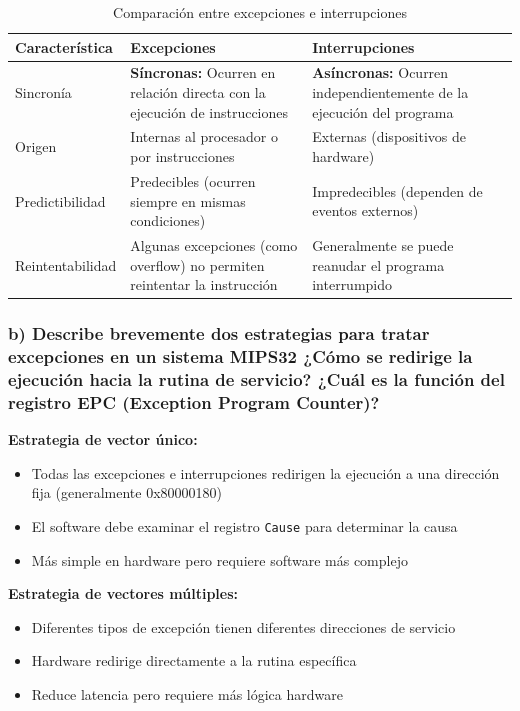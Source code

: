 \documentclass[12pt]{article}
\begin{document}
	\begin{table}[h]
		\centering
		\begin{tabular}{|p{3cm}|p{5cm}|p{5cm}|}
			\hline
			\textbf{Característica} & \textbf{Excepciones} & \textbf{Interrupciones} \\
			\hline
			Sincronía & \textbf{Síncronas:} Ocurren en relación directa con la ejecución de instrucciones & \textbf{Asíncronas:} Ocurren independientemente de la ejecución del programa \\
			\hline
			Origen & Internas al procesador o por instrucciones & Externas (dispositivos de hardware) \\
			\hline
			Predictibilidad & Predecibles (ocurren siempre en mismas condiciones) & Impredecibles (dependen de eventos externos) \\
			\hline
			Reintentabilidad & Algunas excepciones (como overflow) no permiten reintentar la instrucción & Generalmente se puede reanudar el programa interrumpido \\
			\hline
		\end{tabular}
		\caption{Comparación entre excepciones e interrupciones}
	\end{table}
	
	\subsubsection{b) Describe brevemente dos estrategias para tratar excepciones en un sistema MIPS32 ¿Cómo se redirige la ejecución hacia la rutina de servicio? ¿Cuál es la función del registro EPC (Exception Program Counter)?}
	
	\textbf{Estrategia de vector único:}
	\begin{itemize}
		\item Todas las excepciones e interrupciones redirigen la ejecución a una dirección fija (generalmente 0x80000180)
		\item El software debe examinar el registro \texttt{Cause} para determinar la causa
		\item Más simple en hardware pero requiere software más complejo
	\end{itemize}
	
	\textbf{Estrategia de vectores múltiples:}
	\begin{itemize}
		\item Diferentes tipos de excepción tienen diferentes direcciones de servicio
		\item Hardware redirige directamente a la rutina específica
		\item Reduce latencia pero requiere más lógica hardware
	\end{itemize}
	
\end{document}
